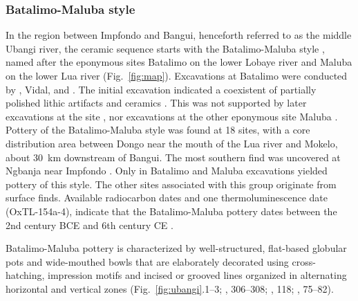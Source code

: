 \documentclass[smallextended,natbib]{svjour3}       %
\begin{document}
\subsubsection*{Batalimo-Maluba style}

In the region between Impfondo and Bangui, henceforth referred to as the middle Ubangi river, the ceramic sequence starts with the Batalimo-Maluba style \citep[75--82]{Seidensticker.2021e}, named after the eponymous sites Batalimo on the lower Lobaye river and Maluba on the lower Lua river (Fig.~\ref{fig:map}). Excavations at Batalimo were conducted by \citet{deBayledesHermens.1975}, Vidal, \citet{Kote.1992} and \citet{Ndanga.2010}. The initial excavation indicated a coexistent of partially polished lithic artifacts and ceramics \citep{Aumassip.1975}. This was not supported by later excavations at the site \citep{Ndanga.2010}, nor excavations at the other eponymous site Maluba \citep{Eggert.1987a}. Pottery of the Batalimo-Maluba style was found at 18 sites, with a core distribution area between Dongo near the mouth of the Lua river and Mokelo, about 30~km downstream of Bangui. The most southern find was uncovered at Ngbanja near Impfondo \citep[Fig.~\ref{fig:timeslices_1_eia}B--E;][81 Fig.~25]{Seidensticker.2021e}. Only in Batalimo and Maluba excavations yielded pottery of this style. The other sites associated with this group originate from surface finds. Available radiocarbon dates and one thermoluminescence date (OxTL-154a-4), indicate that the Batalimo-Maluba pottery dates between the 2nd century BCE and 6th century CE \citep[Fig.~\ref{fig:chrono}; S1; Tab.~S1;][80 Fig.~28]{Seidensticker.2021e}. 

Batalimo-Maluba pottery is characterized by well-structured, flat-based globular pots and wide-mouthed bowls that are elaborately decorated using cross-hatching, impression motifs and incised or grooved lines organized in alternating horizontal and vertical zones (Fig.~\ref{fig:ubangi}.1--3; \citeauthor{Eggert.1993} \citeyear{Eggert.1993}, 306--308; \citeauthor{Seidensticker.2016b} \citeyear{Seidensticker.2016b}, 118; \citeyear{Seidensticker.2021e}, 75--82).
\end{document}
